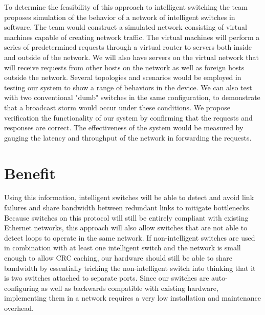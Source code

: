 \documentclass{article}
\begin{document}
	To determine the feasibility of this approach to intelligent switching the team proposes simulation of the behavior of a network of intelligent switches in software.
	The team would construct a simulated network consisting of virtual machines capable of creating network traffic.
	The virtual machines will perform a series of predetermined requests through a virtual router to servers both inside and outside of the network.
	We will also have servers on the virtual network that will receive requests from other hosts on the network as well as foreign hosts outside the network.
	Several topologies and scenarios would be employed in testing our system to show a range of behaviors in the device.
	We can also test with two conventional "dumb" switches in the same configuration, to demonstrate that a broadcast storm would occur under these conditions.
	We propose verification the functionality of our system by confirming that the requests and responses are correct.
	The effectiveness of the system would be measured by gauging the latency and throughput of the network in forwarding the requests.
\section{Benefit}
	Using this information, intelligent switches will be able to detect and avoid link failures and share bandwidth between redundant links to mitigate bottlenecks.
	Because switches on this protocol will still be entirely compliant with existing Ethernet networks, this approach will also allow switches that are not able to detect loops to operate in the same network.
	If non-intelligent switches are used in combination with at least one intelligent switch and the network is small enough to allow CRC caching, our hardware should still be able to share bandwidth by essentially tricking the non-intelligent switch into thinking that it is two switches attached to separate ports.
	Since our switches are auto-configuring as well as backwards compatible with existing hardware, implementing them in a network requires a very low installation and maintenance overhead.
\end{document}
